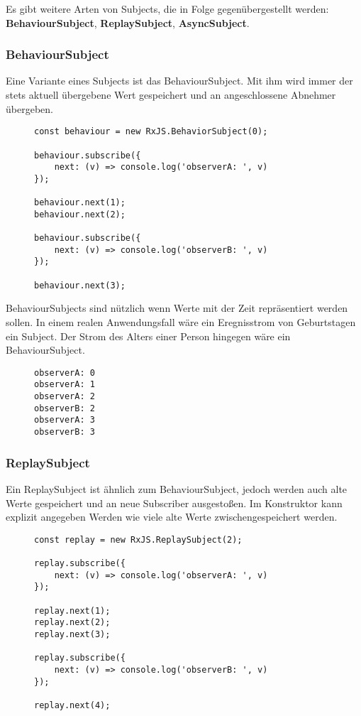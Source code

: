 \noindent
Es gibt weitere Arten von Subjects, die in Folge gegenübergestellt werden: \textbf{BehaviourSubject}, \textbf{ReplaySubject}, \textbf{AsyncSubject}.

\subsubsection{BehaviourSubject}

Eine Variante eines Subjects ist das BehaviourSubject. Mit ihm wird immer der stets aktuell übergebene Wert gespeichert und an angeschlossene Abnehmer übergeben.

\begin{figure}[H]
\begin{lstlisting}[basicstyle=\small]
const behaviour = new RxJS.BehaviorSubject(0);

behaviour.subscribe({
    next: (v) => console.log('observerA: ', v)
});

behaviour.next(1);
behaviour.next(2);

behaviour.subscribe({
    next: (v) => console.log('observerB: ', v)
});

behaviour.next(3);
\end{lstlisting}
\end{figure}

\noindent
BehaviourSubjects sind nützlich wenn Werte mit der Zeit repräsentiert werden sollen. In einem realen Anwendungsfall wäre ein Eregnisstrom von Geburtstagen ein Subject. Der Strom des Alters einer Person hingegen wäre ein BehaviourSubject.

\begin{figure}[H]
\begin{lstlisting}
observerA: 0
observerA: 1
observerA: 2
observerB: 2
observerA: 3
observerB: 3
\end{lstlisting}
\end{figure}

\subsubsection{ReplaySubject}
Ein ReplaySubject ist ähnlich zum BehaviourSubject, jedoch werden auch alte Werte gespeichert und an neue Subscriber ausgestoßen. Im Konstruktor kann explizit angegeben Werden wie viele alte Werte zwischengespeichert werden.

\begin{figure}[H]
\begin{lstlisting}[basicstyle=\small]
const replay = new RxJS.ReplaySubject(2);

replay.subscribe({
    next: (v) => console.log('observerA: ', v)
});

replay.next(1);
replay.next(2);
replay.next(3);

replay.subscribe({
    next: (v) => console.log('observerB: ', v)
});

replay.next(4);
\end{lstlisting}
\end{figure}

